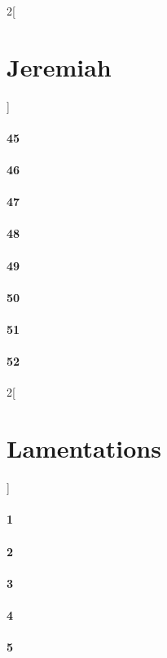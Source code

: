 \documentclass{book}
\begin{document}
\begin{multicols}{2}[\part{Jeremiah}]
\subsection*{45}
\subsection*{46}
\subsection*{47}
\subsection*{48}
\subsection*{49}
\subsection*{50}
\subsection*{51}
\subsection*{52}
\end{multicols}
\begin{multicols}{2}[\part{Lamentations}]
\subsection*{1}
\subsection*{2}
\subsection*{3}
\subsection*{4}
\subsection*{5}
\end{multicols}
\end{document}
